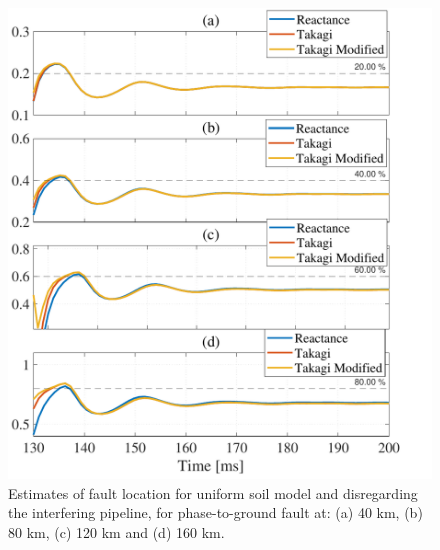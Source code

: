 \documentclass[conference]{IEEEtran}
\begin{document}
\begin{figure}[H]
	\begin{center}
		\includegraphics[width=1.1\columnwidth]{./fig/FaultInterfError.pdf}
		\caption{Estimates of fault location for uniform soil model and disregarding the interfering pipeline, for phase-to-ground fault at: (a) 40 km, (b) 80 km, (c) 120 km and (d) 160 km.}
		\label{fig:ConvUniform_NoInterf}
	\end{center}
\end{figure}
\end{document}
